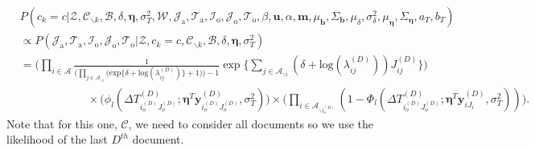    \begin{equation}
   \begin{aligned}
   &P(c_k=c|\mathcal{Z},   \mathcal{C}_{\backslash k},   \mathcal{B}, \delta, \boldsymbol{\eta}, \sigma_T^2, \mathcal{W}, \mathcal{J}_{\mbox{a}}, \mathcal{T}_{\mbox{a}},\mathcal{I}_{\mbox{o}}, \mathcal{J}_{\mbox{o}}, \mathcal{T}_{\mbox{o}}, \beta, \boldsymbol{u}, \alpha, \boldsymbol{m},  \mu_{\boldsymbol{b}}, \Sigma_{\boldsymbol{b}}, \mu_\delta, \sigma^2_\delta,\mu_{\boldsymbol{\eta}}, \Sigma_{\boldsymbol{\eta}}, a_T, b_T)\\&\propto P( \mathcal{J}_{\mbox{a}}, \mathcal{T}_{\mbox{a}},\mathcal{I}_{\mbox{o}}, \mathcal{J}_{\mbox{o}}, \mathcal{T}_{\mbox{o}}| \mathcal{Z}, c_k=c, \mathcal{C}_{\backslash k}, \mathcal{B}, \delta, \boldsymbol{\eta}, \sigma_T^2)\\&=\Big(\prod_{i\in \mathcal{A}} \frac{1}{\Big(\prod_{j \in \mathcal{A}_{\backslash i}} \Big(\mbox{exp}\{\delta+\mbox{log}(\lambda_{ij}^{(D)})\} + 1\Big)\Big)-1}\exp\Big\{\sum_{j \in \mathcal{A}_{\backslash i}} (\delta+\mbox{log}(\lambda_{ij}^{(D)}))J_{ij}^{(D)} \Big\}\Big)\\&\quad\quad\quad\quad\quad\quad\times  \Big(\phi_l(\Delta T^{(D)}_{i_o^{(D)}J_o^{(D)}}; \boldsymbol{\eta}^T\boldsymbol{y}^{(D)}_{i_o^{(D)}J_o^{(D)}}, \sigma_T^2)\Big)\times \Big( \prod_{i\in \mathcal{A}_{\backslash i_o^{(D)}}} (1 - \Phi_l(\Delta T^{(D)}_{i_o^{(D)}J_o^{(D)}};\boldsymbol{\eta}^T\boldsymbol{y}^{(D)}_{iJ_i}, \sigma_T^2))\Big).
   \end{aligned} \label{eqn:samplingC}
   \end{equation} 
   Note that for this one, $\mathcal{C}$, we need to consider all documents so we use the likelihood of the last $D^{th}$ document.
